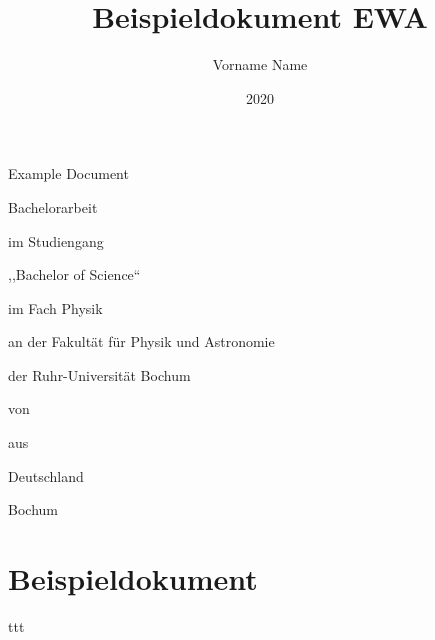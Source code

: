 \documentclass[11pt,
               a4paper,
               parskip=half, style=authoryear, citestyle=authoryear-comp
              bibliography=totoc,
               ]{scrartcl}
\title{Beispieldokument EWA} %
\author{Vorname Name} %
\date{2020} %
\newcommand{\theothertitle}{Example Document} %
\newcommand{\bachelormaster}{Bachelor} %
\newcommand{\sciencearts}{Science} %
\newcommand{\placeofbirth}{Deutschland} %
\newcommand{\location}{Bochum}
\begin{document}
\begin{titlepage}
  \centering
  {\huge\titlefont\thetitle\par
                  \bigskip\bigskip
                  \theothertitle\par}
  \vspace{2cm}

  \begin{spacing}{0.8}
    {\LARGE \bachelormaster arbeit\par
            \bigskip\medskip
            im Studiengang\par
            ,,\bachelormaster{} of \sciencearts``\par
            im Fach Physik\par
            \bigskip\medskip
            an der Fakultät für Physik und Astronomie\par
            der Ruhr-Universität Bochum\par}

    \vfill

    {\LARGE von\par
            \theauthor\par
            \bigskip\medskip
            aus\par
            \placeofbirth\par}
  \end{spacing}

  \vspace{1.8cm}

  {\LARGE \location{} \thedate\par}
\end{titlepage}
\restoregeometry
\cleardoublepage

\tableofcontents
\cleardoublepage

\section{Beispieldokument}


ttt
\end{document}
